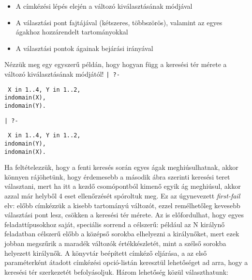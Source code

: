 \begin{itemize}
\item A címkézési lépés elején a változó kiválasztásának módjával
\item A választási pont fajtájával (kétszeres, többszörös), valamint az egyes ágakhoz
hozzárendelt tartományokkal
\item A választási pontok ágainak bejárási irányával
\end{itemize}

Nézzük meg egy egyszerű példán, hogy hogyan függ a keresési tér mérete a változó
kiválasztásának módjától!
\br
{\tt | ?- }\parbox[t]{0.3\textwidth}{\tt
X in 1..4, 
Y in 1..2,\\
indomain(X),\\
indomain(Y).
}
\br
{\tt | ?- }\parbox[t]{0.3\textwidth}{\tt
X in 1..4, 
Y in 1..2,\\
indomain(Y),\\
indomain(X).
}
\br
Ha feltételezzük, hogy a fenti keresés során egyes ágak meghiúsulhatnak, akkor könnyen
rájöhetünk, hogy érdemesebb a második ábra szerinti keresési teret választani, mert ha
itt a kezdő csomópontból kimenő egyik ág meghiúsul, akkor azzal már helyből 4 eset
ellenőrzését spóroltuk meg. Ez az úgynevezett \emph{first-fail} elv: előbb címkézzük
a kisebb tartományú változót, ezzel remélhetőleg kevesebb választási pont lesz,
csökken a keresési tér mérete. Az is előfordulhat, hogy egyes feladattípusokhoz saját,
speciális sorrend a célszerű: például az N királynő feladatban célszerű előbb a középső
sorokba elhelyezni a királynőket, mert ezek jobban megszűrik a maradék változók
értékkészletét, mint a szélső sorokba helyezett királynők.
\br
A \clpfd könyvtár beépített címkéző eljárása, a  az első paraméterként
átadott címkézési opció-listán keresztül lehetőséget ad arra, hogy a keresési tér
szerkezetét befolyásoljuk. Három lehetőség közül választhatunk:

